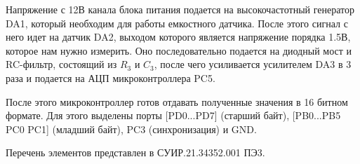 Напряжение с 12В канала блока питания подается на высокочастотный генератор DA1, который необходим для работы емкостного датчика. После этого сигнал с него идет на датчик DA2, выходом которого является напряжение порядка 1.5В, которое нам нужно измерить. Оно последовательно подается на диодный мост и RC-фильтр, состоящий из \(R_3\) и \(C_3\), после чего усиливается усилителем DA3 в 3 раза и подается на АЦП микроконтроллера PC5.

После этого микроконтроллер готов отдавать полученные значения в 16 битном формате. Для этого выделены порты [PD0...PD7] (старший байт), [PB0...PB5 PC0 PC1] (младший байт), PC3 (синхронизация) и GND. 

Перечень элементов представлен в СУИР.21.34352.001 ПЭ3.
\endinput